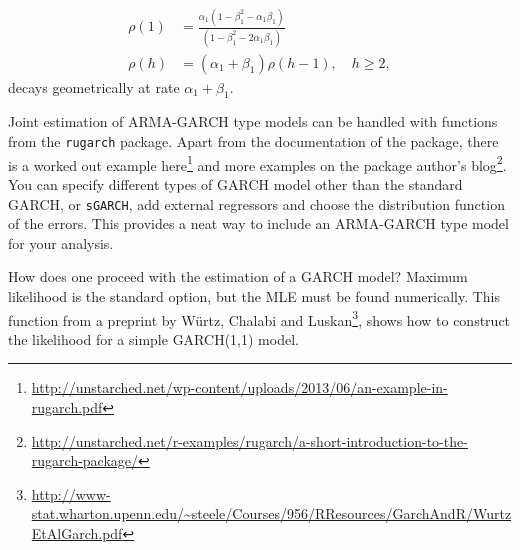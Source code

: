 \documentclass[]{book}
\let\rmarkdownfootnote\footnote%
\def\footnote{\protect\rmarkdownfootnote}
\renewcommand{\href}[2]{#2\footnote{\url{#1}}}
\begin{document}
\begin{align*}
  \rho(1) &= \frac{\alpha_1(1-\beta_1^2-\alpha_1\beta_1)}{(1-\beta_1^2-2\alpha_1\beta_1)} \\
  \rho(h) &= (\alpha_1+\beta_1)\rho(h-1), \quad h \geq 2,
\end{align*}
decays geometrically at rate \(\alpha_1+\beta_1\).

Joint estimation of ARMA-GARCH type models can be handled with functions from the \texttt{rugarch} package. Apart from the documentation of the package, there is a \href{http://unstarched.net/wp-content/uploads/2013/06/an-example-in-rugarch.pdf}{worked out example here} and more \href{http://unstarched.net/r-examples/rugarch/a-short-introduction-to-the-rugarch-package/}{examples on the package author's blog}.
You can specify different types of GARCH model other than the standard GARCH, or \texttt{sGARCH}, add external regressors and choose the distribution function of the errors. This provides a neat way to include an ARMA-GARCH type model for your analysis.

How does one proceed with the estimation of a GARCH model? Maximum likelihood is the standard option, but the MLE must be found numerically. This function from a preprint by \href{http://www-stat.wharton.upenn.edu/~steele/Courses/956/RResources/GarchAndR/WurtzEtAlGarch.pdf}{Würtz, Chalabi and Luskan}, shows how to construct the likelihood for a simple GARCH(1,1) model.
\end{document}
